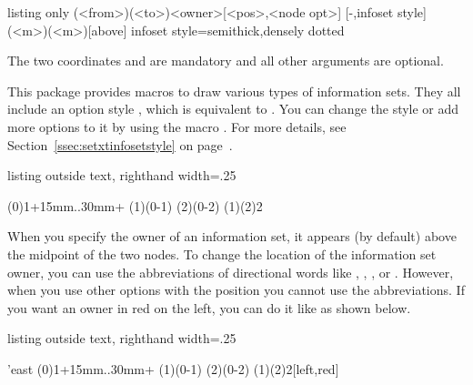 \begin{tcblisting}{listing only}
  (<from>)(<to>){<owner>}[<pos>,<node opt>]
  [-,infoset style](<m>)(<m>){}[above]
  infoset style={semithick,densely dotted}
\end{tcblisting}

The two coordinates  and  are mandatory and all other arguments are optional.

\remark
This package provides macros to draw various types of information sets. They all include an option style \xw{[}\xw{]}, which is equivalent to . You can change the style or add more options to it by using the macro \cmd{\setxtinfosetstyle}. For more details, see Section~\ref{ssec:setxtinfosetstyle} on page~\pageref{ssec:setxtinfosetstyle}.

\begin{tcblisting}{listing outside text, righthand width=.25\linewidth}
\begin{istgame}
\istroot(0){1}+15mm..30mm+
      \endist
\istroot(1)(0-1)
      \endist
\istroot(2)(0-2)
    \endist
\xtInfoset(1)(2){2}
\end{istgame}
\end{tcblisting}

When you specify the owner of an information set, it appears (by default) above the midpoint of the two nodes. To change the location of the information set owner, you can use the abbreviations of directional words like , , , or . However, when you use other options with the position you cannot use the abbreviations. If you want an owner in red on the left, you can do it like  as shown below.

\begin{tcblisting}{listing outside text, righthand width=.25\linewidth}
\begin{istgame}
\setistgrowdirection'{east}
\istroot(0){1}+15mm..30mm+
      \endist
\istroot(1)(0-1)
      \endist
\istroot(2)(0-2)
    \endist
\xtInfoset(1)(2){2}[left,red]
\end{istgame}
\end{tcblisting}

